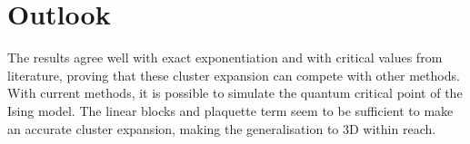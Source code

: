 \documentclass[twocolumn]{article}
\newcounter{a}
\newcounter{b}
\begin{document}
\section{Outlook}

The results agree well with exact exponentiation and with critical values from literature, proving that these cluster expansion can compete with other methods. With current methods, it is possible to simulate the quantum critical point of the Ising model. The linear blocks and plaquette term seem to be sufficient to make an accurate cluster expansion, making the generalisation to 3D within reach.

\small


\end{document}
